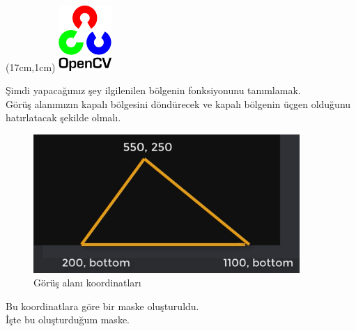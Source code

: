 \documentclass{article}
\begin{document}
\newpage
\begin{textblock*}{5cm}(17cm,1cm) %
    \includegraphics[width=2cm]{image/Resim17.png} %
\end{textblock*}
\noindent Şimdi yapacağımız şey ilgilenilen bölgenin fonksiyonunu tanımlamak.\\[5pt]
Görüş alanımızın kapalı bölgesini döndürecek ve kapalı bölgenin üçgen olduğunu hatırlatacak şekilde olmalı.

\begin{figure}[h]
  \centering
  \includegraphics[width=0.9\textwidth]{image/Resim26.png} %
  \caption{Görüş alanı koordinatları}
  \label{fig:python24}  
\end{figure}
\noindent Bu koordinatlara göre bir maske oluşturuldu.\\[1pt]
İşte bu oluşturduğum maske.\\[5pt]
\end{document}
